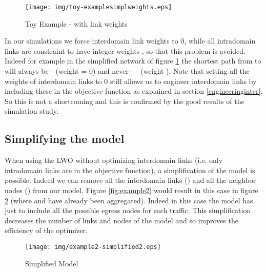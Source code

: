 \documentclass{acm_proc_article-sp}
\begin{document}
\begin{figure}[htbp]
  \centering
  \texttt{[image: img/toy-examplesimplweights.eps]}
  \caption{Toy Example - with link weights}
  \label{fig:toyexamplesimplweights}
\end{figure}

In our simulations we force interdomain link weights to 0, while all
intradomain links are constraint to have integer weights , so that this
problem is avoided. Indeed for example in the simplified network of
figure \ref{fig:toyexamplesimplweights} the shortest path from  to  will always be  - 
(weight = 0) and never  -  -  (weight ). Note that
setting all the weights of interdomain links to 0 still allows us to engineer
interdomain links by including these in the objective function as explained
in section \ref{engineeringinter}. So this is not a shortcoming and this is
confirmed by the good results of the simulation study.

\subsection{Simplifying the model}

When using the LWO without optimizing 
interdomain links (i.e. only intradomain links are in the objective
function), a simplification of the model is possible. Indeed we can
remove all the interdomain links () and all the neighbor
nodes () from our model. Figure \ref{fig:example2} would
result in this case in figure \ref{fig:example2-simplified} (where
 and  have already been aggregated). Indeed in this case the
model has just to include all the possible egress nodes for each
traffic. This simplification decreases the number of links and nodes
of the model and so improves the efficiency of the optimizer.

\begin{figure}[htbp]
  \centering
  \texttt{[image: img/example2-simplified2.eps]}
  \caption{Simplified Model}
  \label{fig:example2-simplified}
\end{figure}
\end{document}
